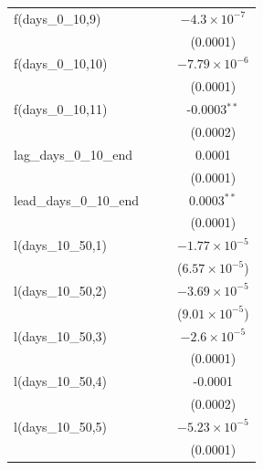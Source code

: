 \begin{tabular}{lccc}
   f(days\_0\_10,9)                 &          &                       & $-4.3\times 10^{-7}$\\    
                                    &          &                       & (0.0001)\\   
   f(days\_0\_10,10)                &          &                       & $-7.79\times 10^{-6}$\\    
                                    &          &                       & (0.0001)\\   
   f(days\_0\_10,11)                &          &                       & -0.0003$^{**}$\\   
                                    &          &                       & (0.0002)\\   
   lag\_days\_0\_10\_end            &          &                       & 0.0001\\   
                                    &          &                       & (0.0001)\\   
   lead\_days\_0\_10\_end           &          &                       & 0.0003$^{**}$\\   
                                    &          &                       & (0.0001)\\   
   l(days\_10\_50,1)                &          &                       & $-1.77\times 10^{-5}$\\    
                                    &          &                       & ($6.57\times 10^{-5}$)\\    
   l(days\_10\_50,2)                &          &                       & $-3.69\times 10^{-5}$\\    
                                    &          &                       & ($9.01\times 10^{-5}$)\\    
   l(days\_10\_50,3)                &          &                       & $-2.6\times 10^{-5}$\\    
                                    &          &                       & (0.0001)\\   
   l(days\_10\_50,4)                &          &                       & -0.0001\\   
                                    &          &                       & (0.0002)\\   
   l(days\_10\_50,5)                &          &                       & $-5.23\times 10^{-5}$\\    
                                    &          &                       & (0.0001)\\   

\end{tabular}
